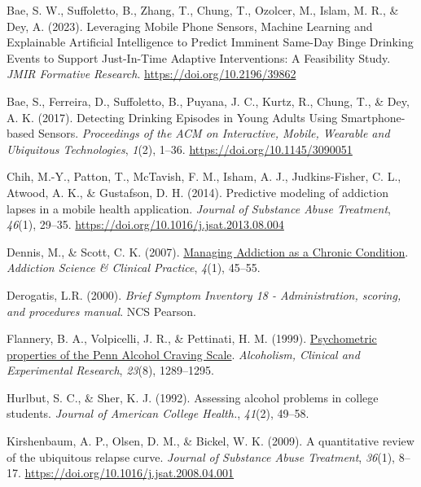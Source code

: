 \documentclass[
  letterpaper,
  DIV=11,
  numbers=noendperiod]{scrartcl}
\newlength{\cslhangindent}
\newenvironment{CSLReferences}[2] %
 {\begin{list}{}{%
  \setlength{\itemindent}{0pt}
  \setlength{\leftmargin}{0pt}
  \setlength{\parsep}{0pt}
  \ifodd #1
   \setlength{\leftmargin}{\cslhangindent}
   \setlength{\itemindent}{-1\cslhangindent}
  \fi
  \setlength{\itemsep}{#2\baselineskip}}}
 {\end{list}}
\begin{document}
\label{refs}
\begin{CSLReferences}{1}{0}
Bae, S. W., Suffoletto, B., Zhang, T., Chung, T., Ozolcer, M., Islam, M.
R., \& Dey, A. (2023). Leveraging {Mobile Phone Sensors}, {Machine
Learning} and {Explainable Artificial Intelligence} to {Predict Imminent
Same-Day Binge Drinking Events} to {Support Just-In-Time Adaptive
Interventions}: {A Feasibility Study}. \emph{JMIR Formative Research}.
\url{https://doi.org/10.2196/39862}

Bae, S., Ferreira, D., Suffoletto, B., Puyana, J. C., Kurtz, R., Chung,
T., \& Dey, A. K. (2017). Detecting {Drinking Episodes} in {Young Adults
Using Smartphone-based Sensors}. \emph{Proceedings of the ACM on
Interactive, Mobile, Wearable and Ubiquitous Technologies}, \emph{1}(2),
1--36. \url{https://doi.org/10.1145/3090051}

Chih, M.-Y., Patton, T., McTavish, F. M., Isham, A. J., Judkins-Fisher,
C. L., Atwood, A. K., \& Gustafson, D. H. (2014). Predictive modeling of
addiction lapses in a mobile health application. \emph{Journal of
Substance Abuse Treatment}, \emph{46}(1), 29--35.
\url{https://doi.org/10.1016/j.jsat.2013.08.004}

Dennis, M., \& Scott, C. K. (2007).
\href{https://www.ncbi.nlm.nih.gov/pmc/articles/PMC2797101}{Managing
{Addiction} as a {Chronic Condition}}. \emph{Addiction Science \&
Clinical Practice}, \emph{4}(1), 45--55.

Derogatis, L.R. (2000). \emph{Brief {Symptom Inventory} 18 -
{Administration}, scoring, and procedures manual}. NCS Pearson.

Flannery, B. A., Volpicelli, J. R., \& Pettinati, H. M. (1999).
\href{https://www.ncbi.nlm.nih.gov/pubmed/10470970}{Psychometric
properties of the {Penn Alcohol Craving Scale}}. \emph{Alcoholism,
Clinical and Experimental Research}, \emph{23}(8), 1289--1295.

Hurlbut, S. C., \& Sher, K. J. (1992). Assessing alcohol problems in
college students. \emph{Journal of American College Health.},
\emph{41}(2), 49--58.

Kirshenbaum, A. P., Olsen, D. M., \& Bickel, W. K. (2009). A
quantitative review of the ubiquitous relapse curve. \emph{Journal of
Substance Abuse Treatment}, \emph{36}(1), 8--17.
\url{https://doi.org/10.1016/j.jsat.2008.04.001}


\end{CSLReferences}
\end{document}
